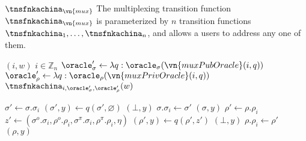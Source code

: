\begin{transitionfn}{$\tnsfnkachina_{\vn{mux}}$}
  The multiplexing transition function $\tnsfnkachina_{\vn{mux}}$ is parameterized
  by $n$ transition functions $\tnsfnkachina_1, \ldots, \tnsfnkachina_n$, and allows a
  users to address any one of them.

  \begin{pubstatedecl}
  \end{pubstatedecl}%
  \vspace{-1em}
  \begin{privstatedecl}
  \end{privstatedecl}

  \begin{receiveinput*}{$(i, w)$}
    \State \Assert $i \in \mathbb{Z}_n$
    \State \Let $\oracle_\sigma' \gets \lambda q : \oracle_\sigma(\vn{muxPubOracle}(i, q))$
    \State \Let $\oracle_\rho' \gets \lambda q : \oracle_\rho(\vn{muxPrivOracle}(i, q))$
    \State \Return $\tnsfnkachina_{i, \oracle_\sigma',
      \oracle_\rho'}(w)$
  \end{receiveinput*}

  \begin{helpers}
      \State \Let $\sigma' \gets \sigma.\sigma_i$
      \State \Let $(\sigma', y) \gets q(\sigma', \varnothing)$
        \Return $(\bot, y)$
      \Else
        \State \Let $\sigma.\sigma_i \gets \sigma'$
        \State \Return $(\sigma, y)$
      \EndIf
    \EndFunction
      \State \Let $\rho' \gets \rho.\rho_i$
      \State \Let $z' \gets (\sigma^o.\sigma_i, \rho^o.\rho_i,
        \sigma^\pi.\sigma_i, \rho^\pi.\rho_i, \eta)$
      \State \Let $(\rho', y) \gets q(\rho', z')$
        \Return $(\bot, y)$
      \Else
        \State \Let $\rho.\rho_i \gets \rho'$
        \State \Return $(\rho, y)$
      \EndIf
    \EndFunction
  \end{helpers}
\end{transitionfn}
